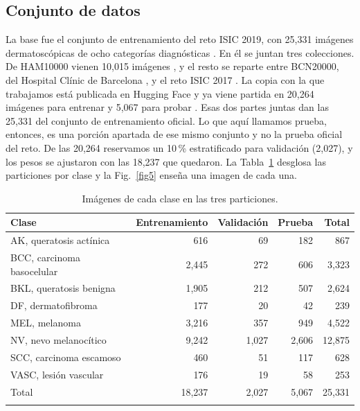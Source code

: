 \documentclass[pdflatex,sn-mathphys-num]{sn-jnl}%
\theoremstyle{thmstyleone}%
\theoremstyle{thmstyletwo}%
\theoremstyle{thmstylethree}%
\begin{document}
\subsection{Conjunto de datos}\label{subsec7}

La base fue el conjunto de entrenamiento del reto ISIC 2019, con 25,331 imágenes dermatoscópicas de ocho categorías diagnósticas \cite{isic2019,isic2019datos}. En él se juntan tres colecciones. De HAM10000 vienen 10,015 imágenes \cite{tschandl2018}, y el resto se reparte entre BCN20000, del Hospital Clínic de Barcelona \cite{hernandezperez2024}, y el reto ISIC 2017 \cite{codella2018}. La copia con la que trabajamos está publicada en Hugging Face y ya viene partida en 20,264 imágenes para entrenar y 5,067 para probar \cite{hf_isic2019}. Esas dos partes juntas dan las 25,331 del conjunto de entrenamiento oficial. Lo que aquí llamamos prueba, entonces, es una porción apartada de ese mismo conjunto y no la prueba oficial del reto. De las 20,264 reservamos un 10\,\% estratificado para validación (2,027), y los pesos se ajustaron con las 18,237 que quedaron. La Tabla~\ref{tab4} desglosa las particiones por clase y la Fig.~\ref{fig5} enseña una imagen de cada una.

\begin{table}[h]
\caption{Imágenes de cada clase en las tres particiones.}\label{tab4}%
\begin{tabular*}{\textwidth}{@{\extracolsep\fill}lrrrr}
\toprule
Clase & Entrenamiento & Validación & Prueba & Total \\
\midrule
AK, queratosis actínica    & 616   & 69    & 182   & 867 \\
BCC, carcinoma basocelular & 2,445 & 272   & 606   & 3,323 \\
BKL, queratosis benigna    & 1,905 & 212   & 507   & 2,624 \\
DF, dermatofibroma         & 177   & 20    & 42    & 239 \\
MEL, melanoma              & 3,216 & 357   & 949   & 4,522 \\
NV, nevo melanocítico      & 9,242 & 1,027 & 2,606 & 12,875 \\
SCC, carcinoma escamoso    & 460   & 51    & 117   & 628 \\
VASC, lesión vascular      & 176   & 19    & 58    & 253 \\
\midrule
Total                      & 18,237 & 2,027 & 5,067 & 25,331 \\
\botrule
\end{tabular*}
\end{table}
\end{document}
